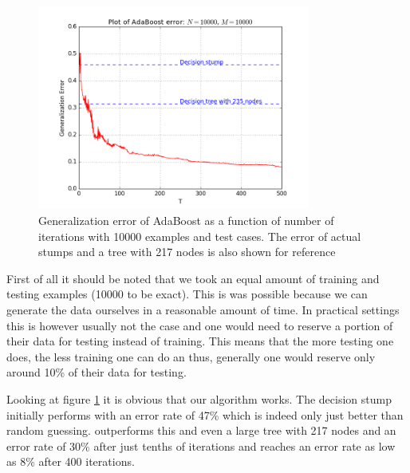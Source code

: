 \begin{figure}[!ht]
  \centering
      \includegraphics[width=0.8\textwidth]{generated/prettyLong.png}
  \caption{Generalization error of AdaBoost as a function of number of iterations with 10000 examples and test cases. The error of actual stumps and a tree with 217 nodes is also shown for reference}
      \label{fig:adaB}
\end{figure}

First of all it should be noted that we took an equal amount of training and testing examples (10000 to be exact). This is was possible because we can generate the data ourselves in a reasonable amount of time. In practical settings this is however usually not the case and one would need to reserve a portion of their data for testing instead of training. This means that the more testing one does, the less training one can do an thus, generally one would reserve only around 10\% of their data for testing.
\par Looking at figure \ref{fig:adaB} it is obvious that our algorithm works. The decision stump initially performs with an error rate of 47\% which is indeed only just better than random guessing. \adaB outperforms this and even a large tree with 217 nodes and an error rate of 30\% after just tenths of iterations and reaches an error rate as low as 8\% after 400 iterations. 

\section{\NHB}
\label{sec:NHB}
